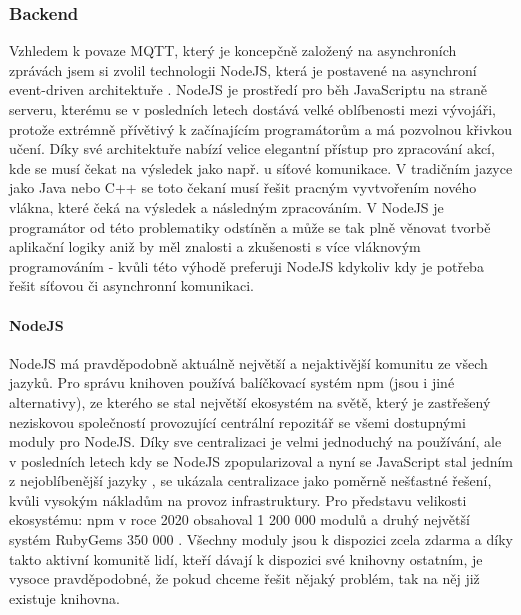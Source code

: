 \subsubsection{Backend}    %
Vzhledem k povaze MQTT, který je koncepčně založený na asynchroních zprávách jsem si zvolil technologii NodeJS, která je postavené na asynchroní event-driven architektuře \cite{nodejs}. NodeJS je prostředí pro běh JavaScriptu na straně serveru, kterému se v posledních letech dostává velké oblíbenosti mezi vývojáři, protože extrémně přívětivý k začínajícím programátorům a má pozvolnou křivkou učení. Díky své architektuře nabízí velice elegantní přístup pro zpracování akcí, kde se musí čekat na výsledek jako např. u síťové komunikace. V tradičním jazyce jako Java nebo C++ se toto čekaní musí řešit pracným vyvtvořením nového vlákna, které čeká na výsledek a následným zpracováním. V NodeJS je programátor od této problematiky odstíněn a může se tak plně věnovat tvorbě aplikační logiky aniž by měl znalosti a zkušenosti s více vláknovým programováním - kvůli této výhodě preferuji NodeJS kdykoliv kdy je potřeba řešit síťovou či asynchronní komunikaci.

\paragraph{NodeJS} NodeJS má pravděpodobně aktuálně největší a nejaktivější komunitu ze všech jazyků. Pro správu knihoven používá balíčkovací systém npm (jsou i jiné alternativy), ze kterého se stal největší ekosystém na světě, který je zastřešený neziskovou společností  provozující centrální repozitář se všemi dostupnými moduly pro NodeJS. Díky sve centralizaci je velmi jednoduchý na používání, ale v posledních letech kdy se NodeJS zpopularizoval a nyní se JavaScript stal jedním z nejoblíbenější jazyky \cite{survey-languages}, se ukázala centralizace jako poměrně nešťastné řešení, kvůli vysokým nákladům na provoz infrastruktury. Pro představu velikosti ekosystému: npm v roce 2020 obsahoval 1 200 000 modulů a druhý největší systém RubyGems  350 000 \cite{modulecounts}. Všechny moduly jsou k dispozici zcela zdarma a díky takto aktivní komunitě lidí, kteří dávají k dispozici své knihovny ostatním, je vysoce pravděpodobné, že pokud chceme řešit nějaký problém, tak na něj již existuje knihovna.

